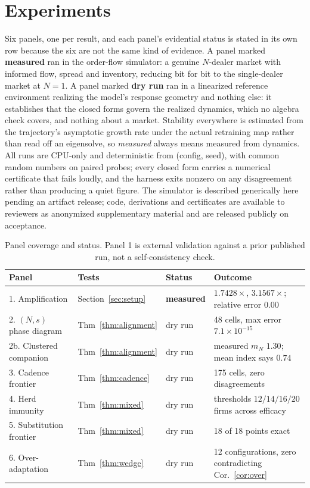 \documentclass{article}
\theoremstyle{plain}
\theoremstyle{definition}
\newcommand{\mN}{m_N}
\begin{document}
\section{Experiments}
\label{sec:experiments}

Six panels, one per result, and each panel's evidential status is stated in its own row because the six are not the same kind of evidence. A panel marked \textbf{measured} ran in the order-flow simulator: a genuine $N$-dealer market with informed flow, spread and inventory, reducing bit for bit to the single-dealer market at $N=1$. A panel marked \textbf{dry run} ran in a linearized reference environment realizing the model's response geometry and nothing else: it establishes that the closed forms govern the realized dynamics, which no algebra check covers, and nothing about a market. Stability everywhere is estimated from the trajectory's asymptotic growth rate under the actual retraining map rather than read off an eigensolve, so \emph{measured} always means measured from dynamics. All runs are CPU-only and deterministic from (config, seed), with common random numbers on paired probes; every closed form carries a numerical certificate that fails loudly, and the harness exits nonzero on any disagreement rather than producing a quiet figure. The simulator is described generically here pending an artifact release; code, derivations and certificates are available to reviewers as anonymized supplementary material and are released publicly on acceptance.

\begin{table}[t]
\centering
\caption{Panel coverage and status. Panel 1 is external validation against a prior published run, not a self-consistency check.}
\label{tab:panels}
\small
\begin{tabular}{llll}
\toprule
Panel & Tests & Status & Outcome \\
\midrule
1. Amplification & Section~\ref{sec:setup} & \textbf{measured} & $1.7428\times$, $3.1567\times$; relative error $0.00$ \\
2. $(N,s)$ phase diagram & Thm~\ref{thm:alignment} & dry run & 48 cells, max error $7.1\times 10^{-15}$ \\
2b. Clustered companion & Thm~\ref{thm:alignment} & dry run & measured $\mN$ $1.30$; mean index says $0.74$ \\
3. Cadence frontier & Thm~\ref{thm:cadence} & dry run & 175 cells, zero disagreements \\
4. Herd immunity & Thm~\ref{thm:mixed} & dry run & thresholds $12/14/16/20$ firms across efficacy \\
5. Substitution frontier & Thm~\ref{thm:mixed} & dry run & 18 of 18 points exact \\
6. Over-adaptation & Thm~\ref{thm:wedge} & dry run & 12 configurations, zero contradicting Cor.~\ref{cor:over} \\
\bottomrule
\end{tabular}
\end{table}
\end{document}

